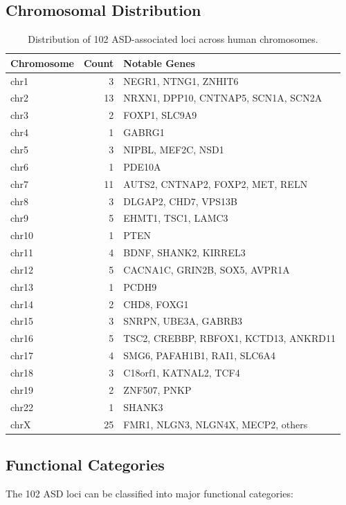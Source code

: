 \documentclass[12pt]{article}
\begin{document}
\subsection{Chromosomal Distribution}
\begin{table}[h]
\centering
\begin{tabular}{@{}lrl@{}}
\toprule
Chromosome & Count & Notable Genes \\
\midrule
chr1  & 3  & NEGR1, NTNG1, ZNHIT6 \\
chr2  & 13 & NRXN1, DPP10, CNTNAP5, SCN1A, SCN2A \\
chr3  & 2  & FOXP1, SLC9A9 \\
chr4  & 1  & GABRG1 \\
chr5  & 3  & NIPBL, MEF2C, NSD1 \\
chr6  & 1  & PDE10A \\
chr7  & 11 & AUTS2, CNTNAP2, FOXP2, MET, RELN \\
chr8  & 3  & DLGAP2, CHD7, VPS13B \\
chr9  & 5  & EHMT1, TSC1, LAMC3 \\
chr10 & 1  & PTEN \\
chr11 & 4  & BDNF, SHANK2, KIRREL3 \\
chr12 & 5  & CACNA1C, GRIN2B, SOX5, AVPR1A \\
chr13 & 1  & PCDH9 \\
chr14 & 2  & CHD8, FOXG1 \\
chr15 & 3  & SNRPN, UBE3A, GABRB3 \\
chr16 & 5  & TSC2, CREBBP, RBFOX1, KCTD13, ANKRD11 \\
chr17 & 4  & SMG6, PAFAH1B1, RAI1, SLC6A4 \\
chr18 & 3  & C18orf1, KATNAL2, TCF4 \\
chr19 & 2  & ZNF507, PNKP \\
chr22 & 1  & SHANK3 \\
chrX  & 25 & FMR1, NLGN3, NLGN4X, MECP2, others \\
\bottomrule
\end{tabular}
\caption{Distribution of 102 ASD-associated loci across human chromosomes.}
\end{table}

\subsection{Functional Categories}
The 102 ASD loci can be classified into major functional categories:
\end{document}
